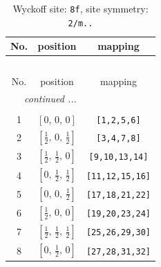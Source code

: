 \documentclass[fleqn,8pt]{jsarticle}
\begin{document}
\begin{longtable}{ccc}
\caption{Wyckoff site: {\tt 8f}, site symmetry: {\tt 2/m..}}
 \\
 \hline \hline
No. & position & mapping \\ \hline \endfirsthead

\multicolumn{2}{l}{\tablename\ \thetable{}} \\
 \hline \hline
No. & position & mapping \\ \hline \endhead

 \hline \hline
\multicolumn{2}{r}{\footnotesize\it continued ...} \\ \endfoot

 \hline \hline
\multicolumn{2}{r}{} \\ \endlastfoot

1 & $\left[ 0,\, 0,\, 0 \right]$ & {\tt [1,2,5,6]} \\ \hline
2 & $\left[ \frac{1}{2},\, 0,\, \frac{1}{2} \right]$ & {\tt [3,4,7,8]} \\ \hline
3 & $\left[ \frac{1}{2},\, \frac{1}{2},\, 0 \right]$ & {\tt [9,10,13,14]} \\ \hline
4 & $\left[ 0,\, \frac{1}{2},\, \frac{1}{2} \right]$ & {\tt [11,12,15,16]} \\ \hline
5 & $\left[ 0,\, 0,\, \frac{1}{2} \right]$ & {\tt [17,18,21,22]} \\ \hline
6 & $\left[ \frac{1}{2},\, 0,\, 0 \right]$ & {\tt [19,20,23,24]} \\ \hline
7 & $\left[ \frac{1}{2},\, \frac{1}{2},\, \frac{1}{2} \right]$ & {\tt [25,26,29,30]} \\ \hline
8 & $\left[ 0,\, \frac{1}{2},\, 0 \right]$ & {\tt [27,28,31,32]} \\
\end{longtable}
\renewcommand{\arraystretch}{1.2}
\end{document}
